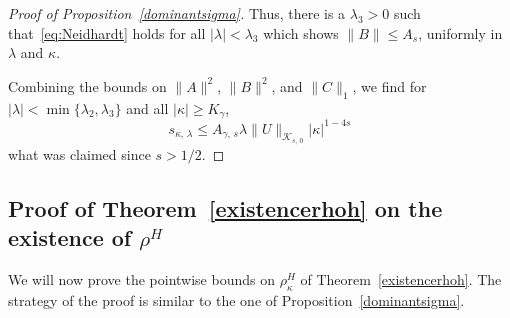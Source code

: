 \documentclass[10pt]{amsart}
\theoremstyle{definition}
\newcommand*\cK{\mathcal{K}}
\begin{document}
\begin{proof}[Proof of Proposition~\ref{dominantsigma}]
Thus, there is a $\lambda_3>0$ such that~\eqref{eq:Neidhardt} holds for all $|\lambda|<\lambda_3$ which shows $\|B\|\leq A_{s}$, uniformly in $\lambda$ and $\kappa$.

Combining the bounds on $\|A\|^2$, $\|B\|^2$, and $\|C\|_1$, we find for $|\lambda|<\min\{\lambda_2,\lambda_3\}$ and all $|\kappa|\geq K_\gamma$,
\[
s_{\kappa,\,\lambda}
\leq A_{\gamma,\,s}\lambda \|U\|_{\cK_{s,\,0}} |\kappa|^{1-4s}
\]
what was claimed since $s>1/2$.
\end{proof}



\subsection{Proof of Theorem~\ref{existencerhoh} on the existence of \texorpdfstring{$\rho^H$}{rhoH}}
We will now prove the pointwise bounds on $\rho_{\kappa}^H$ of Theorem~\ref{existencerhoh}. The strategy of the proof is similar to the one of Proposition~\ref{dominantsigma}.
\end{document}
